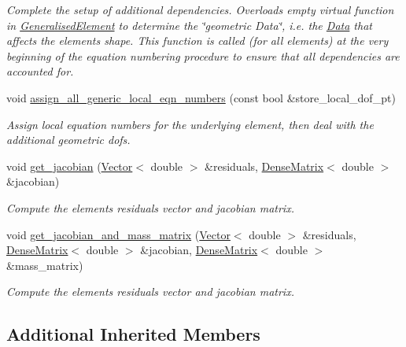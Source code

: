 \begin{DoxyCompactItemize}
\begin{DoxyCompactList}\small\item\em Complete the setup of additional dependencies. Overloads empty virtual function in \hyperlink{classoomph_1_1GeneralisedElement}{Generalised\+Element} to determine the \char`\"{}geometric
\+Data\char`\"{}, i.\+e. the \hyperlink{classoomph_1_1Data}{Data} that affects the element\textquotesingle{}s shape. This function is called (for all elements) at the very beginning of the equation numbering procedure to ensure that all dependencies are accounted for. \end{DoxyCompactList}\item 
void \hyperlink{classoomph_1_1ElementWithSpecificMovingNodes_a82531e83f80254735130558f0562cdff}{assign\+\_\+all\+\_\+generic\+\_\+local\+\_\+eqn\+\_\+numbers} (const bool \&store\+\_\+local\+\_\+dof\+\_\+pt)
\begin{DoxyCompactList}\small\item\em Assign local equation numbers for the underlying element, then deal with the additional geometric dofs. \end{DoxyCompactList}\item 
void \hyperlink{classoomph_1_1ElementWithSpecificMovingNodes_ad6f4748cbd652a05cf2bff03549e5aaa}{get\+\_\+jacobian} (\hyperlink{classoomph_1_1Vector}{Vector}$<$ double $>$ \&residuals, \hyperlink{classoomph_1_1DenseMatrix}{Dense\+Matrix}$<$ double $>$ \&jacobian)
\begin{DoxyCompactList}\small\item\em Compute the element\textquotesingle{}s residuals vector and jacobian matrix. \end{DoxyCompactList}\item 
void \hyperlink{classoomph_1_1ElementWithSpecificMovingNodes_a02faf26f26815b4315d6ae82ff00da4c}{get\+\_\+jacobian\+\_\+and\+\_\+mass\+\_\+matrix} (\hyperlink{classoomph_1_1Vector}{Vector}$<$ double $>$ \&residuals, \hyperlink{classoomph_1_1DenseMatrix}{Dense\+Matrix}$<$ double $>$ \&jacobian, \hyperlink{classoomph_1_1DenseMatrix}{Dense\+Matrix}$<$ double $>$ \&mass\+\_\+matrix)
\begin{DoxyCompactList}\small\item\em Compute the element\textquotesingle{}s residuals vector and jacobian matrix. \end{DoxyCompactList}\end{DoxyCompactItemize}
\subsection*{Additional Inherited Members}


